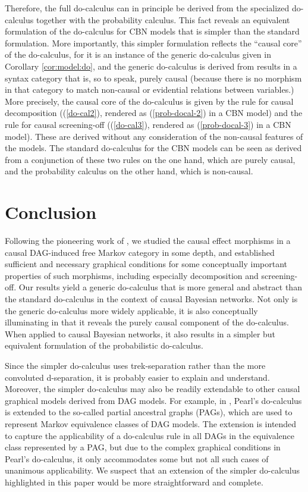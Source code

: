 \documentclass[12pt]{amsart}
\theoremstyle{plain}
\theoremstyle{definition}
\theoremstyle{remark}
\numberwithin{equation}{section}
\theoremstyle{plain}
\newcommand{\0}{\emptyset}
\begin{document}

Therefore, the full do-calculus can in principle be derived from the specialized do-calculus together with the probability calculus. This fact reveals an equivalent formulation of the do-calculus for CBN models that is simpler than the standard formulation. More importantly, this simpler formulation reflects the ``causal core'' of the do-calculus, for it is an instance of the generic do-calculus given in Corollary \ref{cor:model:do}, and the generic do-calculus is derived from results in a syntax category that is, so to speak, purely causal (because there is no morphism in that category to match non-causal or evidential relations between variables.) More precisely, the causal core of the do-calculus is given by the rule for causal decomposition ((\ref{do-cal2}), rendered as (\ref{prob-docal-2}) in a CBN model) and the rule for causal screening-off ((\ref{do-cal3}), rendered as (\ref{prob-docal-3}) in a CBN model). These are derived without any consideration of the non-causal features of the models. The standard do-calculus for the CBN models can be seen as derived from a conjunction of these two rules on the one hand, which are purely causal, and the probability calculus on the other hand, which is non-causal.

\section{Conclusion}
\label{sec:con}
Following the pioneering work of \cite{Fong:thesis}, we studied the causal effect morphisms in a causal DAG-induced free Markov category in some depth, and established sufficient and necessary graphical conditions for some conceptually important properties of such morphisms, including especially decomposition and screening-off. Our results yield a generic do-calculus that is more general and abstract than the standard do-calculus in the context of causal Bayesian networks. Not only is the generic do-calculus more widely applicable, it is also conceptually illuminating in that it reveals the purely causal component of the do-calculus. When applied to causal Bayesian networks, it also results in a simpler but equivalent formulation of the probabilistic do-calculus.

Since the simpler do-calculus uses trek-separation rather than the more convoluted d-separation, it is probably easier to explain and understand.  Moreover, the simpler do-calculus may also be readily extendable to other causal graphical models derived from DAG models. For example,  in \cite{Zhang2008}, Pearl's do-calculus is extended to the so-called partial ancestral graphs (PAGs), which are used to represent Markov equivalence classes of DAG models.  The extension is intended to capture the applicability of a do-calculus rule in all DAGs in the equivalence class represented by a PAG, but due to the complex graphical conditions in Pearl's do-calculus,  it only accommodates some but not all such cases of unanimous applicability.  We suspect that an extension of the simpler do-calculus highlighted in this paper would be more straightforward and complete.
\end{document}
